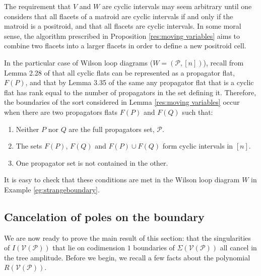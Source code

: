 \documentclass[11pt]{article}
\newcommand{\drawWLD}[2]{

\pgfmathsetmacro{\n}{#1}
\pgfmathsetmacro{\radius}{#2}
\pgfmathsetmacro{\angle}{360/\n}
\draw (0,0) circle (\radius);
    \foreach \i in {1,2,...,\n} {
      \draw (\angle*\i:\radius) node {$\bullet$};
    }

}
\newcommand{\drawprop}[4]{
\pgfmathsetmacro{\r}{#1}
\pgfmathsetmacro{\bumpr}{#2}
\pgfmathsetmacro{\s}{#3}
\pgfmathsetmacro{\bumps}{#4}
\pgfmathsetmacro{\perturbe}{\angle/\n}
\begin{scope}
\draw[smallpropagator] (\angle*\r + \angle/2 + \bumpr*\perturbe:\radius) -- (\angle*\s + \angle/2 + \bumps*\perturbe:\radius);
\end{scope}
}
\newcommand{\drawnumbers}{
  \foreach \i in {1,2,...,\n} {
  \pgfmathsetmacro{\x}{\angle*\i}
  \draw (\x:\radius*1.25) node {\footnotesize \i};
}
}
\def\ba #1\ea{\begin{align} #1 \end{align}}
\def\bas #1\eas{\begin{align*} #1 \end{align*}}
\newcommand{\cP}{\mathcal{P}}
\newcommand{\cV}{\mathcal{V}}
\newcommand{\VP}{\cV(\cP)}
\theoremstyle{remark}
\theoremstyle{definition}
\begin{document}
The requirement that $V$ and $W$ are cyclic intervals may seem arbitrary until one considers that all flacets of a matroid are cyclic intervals if and only if the matroid is a positroid, and that all flacets are cyclic intervals. In some moral sense, the algorithm prescribed in Proposition \ref{res:moving variables} aims to combine two flacets into a larger flacets in order to define a new positroid cell. 

In the particular case of Wilson loop diagrams ($W = (\cP, [n])$), recall from Lemma 2.28 of \cite{Wilsonloop} that all cyclic flats can be represented as a propagator flat, $F(P)$, and that by Lemma 3.35 of the same any propagator flat that is a cyclic flat has rank equal to the number of propagators in the set defining it. Therefore, the boundaries of the sort considered in Lemma \ref{res:moving variables} occur when there are two propagators flats $F(P)$ and $F(Q)$ such that: 
\begin{enumerate} 
\item Neither $P$ nor $Q$ are the full propagators set, $\cP$. 
\item The sets $F(P)$, $F(Q)$ and $F(P) \cup F(Q)$ form cyclic intervals in $[n]$.
\item One propagator set is not contained in the other. \end{enumerate} 
It is easy to check that these conditions are met in the Wilson loop diagram $W$ in Example \ref{eg:strangeboundary}.


\subsection{Cancelation of poles on the boundary \label{sec:cancelation}}

We are now ready to prove the main result of this section: that the singularities of $I(\VP)$ that lie on codimension $1$ boundaries of $\Sigma(\VP)$ all cancel in the tree amplitude. Before we begin, we recall a few facts about the polynomial $R(\VP)$. %
\end{document}
